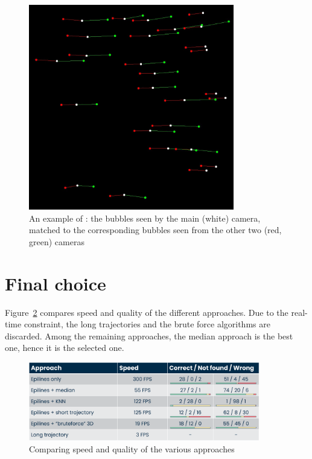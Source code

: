 \begin{figure}[H]
	\centerline{\includegraphics[width=0.8\textwidth]{images/match-observation.png}}
	\caption{\centering An example of \match*: the bubbles seen by the main (white) camera, matched to the corresponding bubbles seen from the other two (red, green) cameras}
	\label{fig:match:example}
\end{figure}

\newpage
 \newpage
 \newpage
 \newpage
 \newpage
 \newpage
 \newpage
 \newpage

\section{Final choice}

Figure~\ref{fig:match:comparison} compares speed and quality of the different approaches.
Due to the real-time constraint, the long trajectories and the brute force algorithms are discarded.
Among the remaining approaches, the median approach is the best one, hence it is the selected one. 

\begin{figure}
	\centerline{\includegraphics[width=0.9\textwidth]{images/3d-matching-comparison-without-chosen.png}}
	\caption{\centering Comparing speed and quality of the various \match* approaches}
	\label{fig:match:comparison}
\end{figure}
